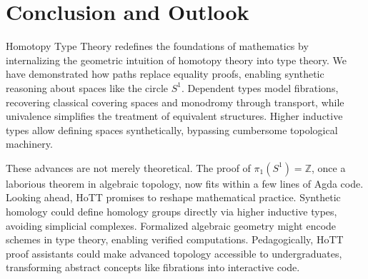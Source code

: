\section{Conclusion and Outlook}\label{sec:conc}

Homotopy Type Theory redefines the foundations of mathematics by internalizing the geometric intuition of homotopy theory into type theory. We have demonstrated how paths replace equality proofs, enabling synthetic reasoning about spaces like the circle \(S^1\). Dependent types model fibrations, recovering classical covering spaces and monodromy through transport, while univalence simplifies the treatment of equivalent structures. Higher inductive types allow defining spaces synthetically, bypassing cumbersome topological machinery.  

These advances are not merely theoretical. The proof of \(\pi_1(S^1) = \mathbb{Z}\), once a laborious theorem in algebraic topology, now fits within a few lines of Agda code. Looking ahead, HoTT promises to reshape mathematical practice. Synthetic homology could define homology groups directly via higher inductive types, avoiding simplicial complexes. Formalized algebraic geometry might encode schemes in type theory, enabling verified computations. Pedagogically, HoTT proof assistants could make advanced topology accessible to undergraduates, transforming abstract concepts like fibrations into interactive code.  